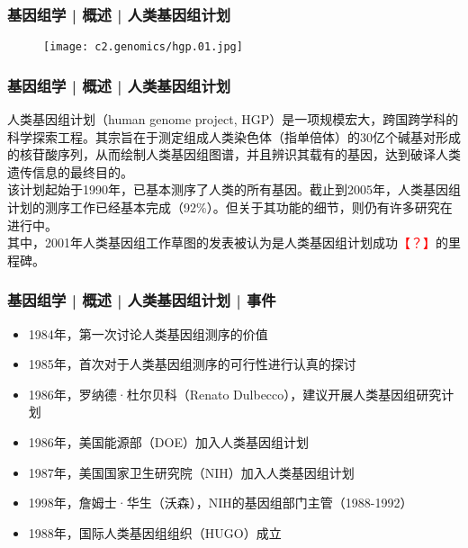 \begin{frame}
  \frametitle{基因组学 | 概述 | 人类基因组计划}
  \begin{figure}
    \centering
    \texttt{[image: c2.genomics/hgp.01.jpg]}
  \end{figure}
\end{frame}

\begin{frame}
  \frametitle{基因组学 | 概述 | 人类基因组计划}
人类基因组计划（human genome project, HGP）是一项规模宏大，跨国跨学科的科学探索工程。其宗旨在于测定组成人类染色体（指单倍体）的30亿个碱基对形成的核苷酸序列，从而绘制人类基因组图谱，并且辨识其载有的基因，达到破译人类遗传信息的最终目的。\\
\vspace{1em}
该计划起始于1990年，已基本测序了人类的所有基因。截止到2005年，人类基因组计划的测序工作已经基本完成（92\%）。但关于其功能的细节，则仍有许多研究在进行中。\\
\vspace{1em}
其中，2001年人类基因组工作草图的发表被认为是人类基因组计划成功\textcolor{red}{【？】}的里程碑。
\end{frame}

\begin{frame}
  \frametitle{基因组学 | 概述 | 人类基因组计划 | 事件}
  \begin{itemize}[<+->]
    \item 1984年，第一次讨论人类基因组测序的价值
    \item 1985年，首次对于人类基因组测序的可行性进行认真的探讨
    \item 1986年，罗纳德·杜尔贝科（Renato Dulbecco），建议开展人类基因组研究计划
    \item 1986年，美国能源部（DOE）加入人类基因组计划
    \item 1987年，美国国家卫生研究院（NIH）加入人类基因组计划
    \item 1998年，詹姆士·华生（沃森），NIH的基因组部门主管（1988-1992）
    \item 1988年，国际人类基因组组织（HUGO）成立
  \end{itemize}
\end{frame}

